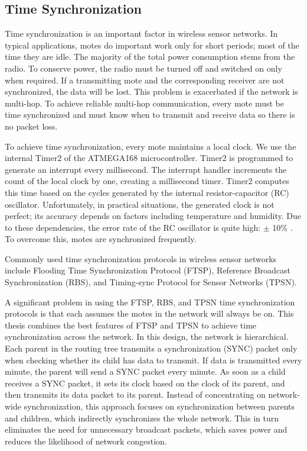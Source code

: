 \subsection{Time Synchronization}
Time synchronization is an important factor in wireless sensor networks. In typical applications, motes do important work only for short periods; most of the time they are idle. The majority of the total power consumption stems from the radio. To conserve power, the radio must be turned off and switched on only when required. If a transmitting mote and the corresponding receiver are not synchronized, the data will be lost. This problem is exacerbated if the network is multi-hop. To achieve reliable multi-hop communication, every mote must be time synchronized and must know when to transmit and receive data so there is no packet loss.

To achieve time synchronization, every mote maintains a local clock. We use the internal Timer2 of the ATMEGA168 microcontroller. Timer2 is programmed to generate an interrupt every millisecond. The interrupt handler increments the count of the local clock by one, creating a millisecond timer. Timer2 computes this time based on the cycles generated by the internal resistor-capacitor (RC) oscillator. Unfortunately, in practical situations, the generated clock is not perfect; its accuracy depends on factors including temperature and humidity. Due to these dependencies, the error rate of the RC oscillator is quite high: $\pm$ 10\% \cite{bib_atmega}. To overcome this, motes are synchronized frequently.

Commonly used time synchronization protocols in wireless sensor networks include Flooding Time Synchronization Protocol (FTSP), Reference Broadcast Synchronization (RBS), and Timing-sync Protocol for Sensor Networks (TPSN).

A significant problem in using the FTSP, RBS, and TPSN time synchronization protocols is that each assumes the motes in the network will always be on. This thesis combines the best features of FTSP and TPSN to achieve time synchronization across the network. In this design, the network is hierarchical. Each parent in the routing tree transmits a synchronization (SYNC) packet only when checking whether its child has data to transmit. If data is transmitted every minute, the parent will send a SYNC packet every minute. As soon as a child receives a SYNC packet, it sets its clock based on the clock of its parent, and then transmits its data packet to its parent. Instead of concentrating on network-wide synchronization, this approach focuses on synchronization between parents and children, which indirectly synchronizes the whole network. This in turn eliminates the need for unnecessary broadcast packets, which saves power and reduces the likelihood of network congestion.

